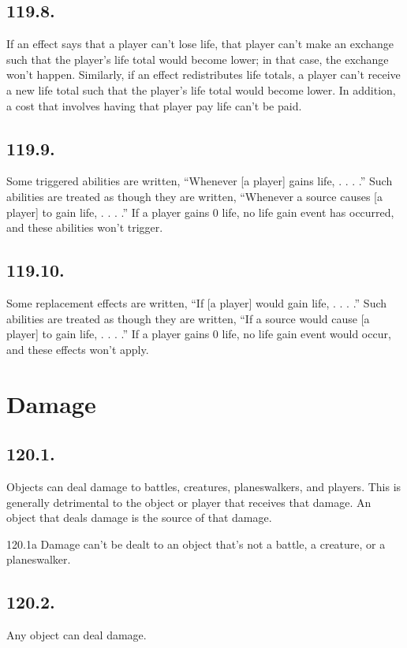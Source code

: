 \subsection*{119.8.}
If an effect says that a player can’t lose life, that player can’t make an exchange such that the player’s life total would become lower; in that case, the exchange won’t happen. Similarly, if an effect redistributes life totals, a player can’t receive a new life total such that the player’s life total would become lower. In addition, a cost that involves having that player pay life can’t be paid.

\subsection*{119.9.}
Some triggered abilities are written, “Whenever [a player] gains life, . . . .” Such abilities are treated as though they are written, “Whenever a source causes [a player] to gain life, . . . .” If a player gains 0 life, no life gain event has occurred, and these abilities won’t trigger.

\subsection*{119.10.}
Some replacement effects are written, “If [a player] would gain life, . . . .” Such abilities are treated as though they are written, “If a source would cause [a player] to gain life, . . . .” If a player gains 0 life, no life gain event would occur, and these effects won’t apply.

\section{Damage}
\subsection*{120.1.}
Objects can deal damage to battles, creatures, planeswalkers, and players. This is generally detrimental to the object or player that receives that damage. An object that deals damage is the source of that damage.

120.1a Damage can’t be dealt to an object that’s not a battle, a creature, or a planeswalker.

\subsection*{120.2.}
Any object can deal damage.


